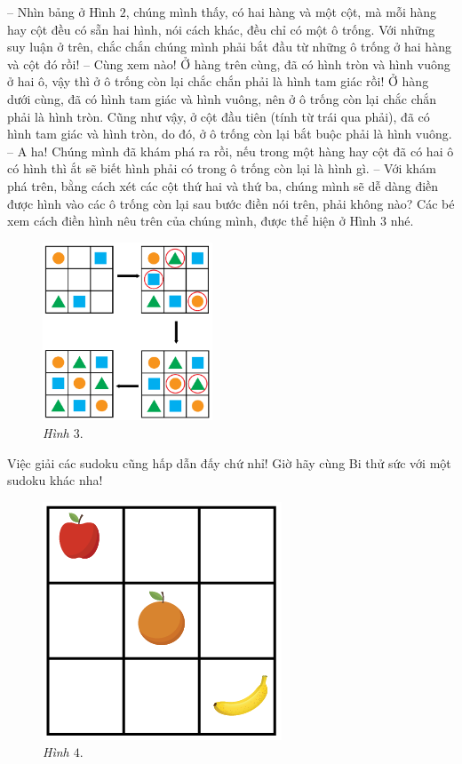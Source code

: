 	\vskip 0.15cm
	-- Nhìn bảng ở Hình $2$, chúng mình thấy, có hai hàng và một cột, mà mỗi hàng hay cột đều có sẵn hai hình, nói cách khác, đều chỉ có một ô trống. Với những suy luận ở trên, chắc chắn chúng mình phải bắt đầu từ những ô trống ở hai hàng và cột đó rồi!
	\vskip 0.15cm
	-- Cùng xem nào! Ở hàng trên cùng, đã có hình tròn và hình vuông ở hai ô, vậy thì ở ô trống còn lại chắc chắn phải là hình tam giác rồi! Ở hàng dưới cùng, đã có hình tam giác và hình vuông, nên ở ô trống còn lại chắc chắn phải là hình tròn. Cũng như vậy, ở cột đầu tiên (tính từ trái qua phải), đã có hình tam giác và hình tròn, do đó, ở ô trống còn lại bắt buộc phải là hình vuông.
	\vskip 0.15cm
	-- A ha! Chúng mình đã khám phá ra rồi, nếu trong một hàng hay cột đã có hai ô có hình thì ắt sẽ biết hình phải có trong ô trống còn lại là hình gì.
	\vskip 0.15cm
	-- Với khám phá trên, bằng cách xét các cột thứ hai và thứ ba, chúng mình sẽ dễ dàng điền được hình vào các ô trống còn lại sau bước điền nói trên, phải không nào?
	\vskip 0.15cm
	Các bé xem cách điền hình nêu trên của chúng mình, được thể hiện ở Hình $3$ nhé.
		\begin{figure}[H]
			\centering
			\vspace*{-10pt}
			\captionsetup{labelformat= empty, justification=centering}
			\includegraphics[width=0.45\textwidth]{hinh3}
			\caption{\small\textit{Hình $3.$}}
			\vspace*{-10pt}
		\end{figure}
	Việc giải các sudoku cũng hấp dẫn đấy chứ nhỉ! Giờ hãy cùng Bi thử sức với một sudoku  khác nha!
	\vskip 0.1cm
	\begin{figure}
		\vspace*{-10pt}
		\centering
		\captionsetup{labelformat=empty, justification=centering}
		\includegraphics[scale=0.4]{hinh4}
		\caption{\textit{\small Hình $4.$}}
		\vspace*{-15pt}
	\end{figure}
